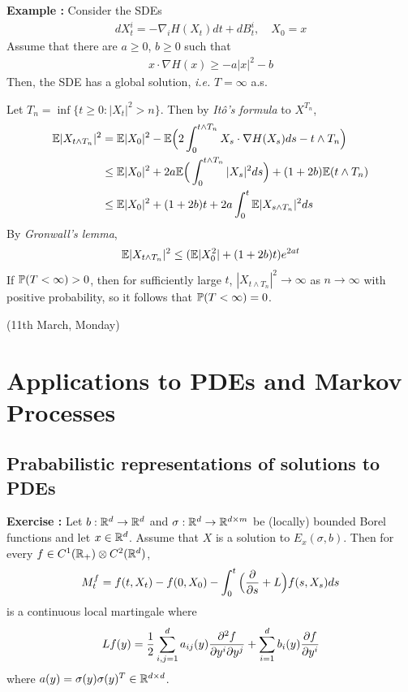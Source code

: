 \documentclass[10pt,a4paper]{article}
\newenvironment{proof}
{\begin{changemargin}{0.5cm}{0.5cm} 
	}%
	{\end{changemargin}
}
\newenvironment{p}
{\begin{proof} 
	}%
	{\end{proof}
}
\begin{document}
\textbf{Example :} Consider the SDEs
\begin{align*}
dX_t^i = -\nabla_i H(X_t) dt + dB_t^i, \quad X_0 =x
\end{align*}
Assume that there are $a\geq 0$, $b\geq 0$ such that
\begin{align*}
x\cdot \nabla H(x) \geq - a|x|^2 -b
\end{align*}
Then, the SDE has a global solution, \textit{i.e.} $T=\infty$ a.s.
\begin{p}
\pf Let $T_n = \inf \{t\geq 0 : |X_t|^2 >n \}$. Then by \emph{It\^o's formula} to $X^{T_n}$,
\begin{align*}
\mathbb{E} |X_{t\wedge T_n}|^2 & = \mathbb{E} |X_0|^2 - \mathbb{E} \Big( 2 \int_0^{t\wedge T_n} X_s \cdot \nabla H(X_s) ds - t\wedge T_n \Big) \\
& \leq \mathbb{E} |X_0|^2 + 2a \mathbb{E} \Big( \int_0^{t\wedge T_n} |X_s|^2 ds \Big) + (1+ 2b) \mathbb{E} (t\wedge T_n) \\
& \leq \mathbb{E} |X_0|^2 + (1+2b)t + 2a\int_0^t \mathbb{E} |X_{s\wedge T_n}|^2 ds  
\end{align*}
By \emph{Gronwall's lemma},
\begin{align*}
\mathbb{E} |X_{t\wedge T_n}|^2 \leq (\mathbb{E} |X_0^2| + (1+2b)t) e^{2at}
\end{align*}
If $\mathbb{P}(T< \infty)>0$, then for sufficiently large $t$, $|X_{t\wedge T_n}|^2 \rightarrow \infty$ as $n\rightarrow \infty$ with positive probability, so it follows that $\mathbb{P}(T< \infty) =0$.

\eop
\end{p}
\s

\newday

(11th March, Monday)

\section{Applications to PDEs and Markov Processes}

\subsection{Prababilistic representations of solutions to PDEs}

\textbf{Exercise :} Let $b: \mathbb{R}^d \rightarrow \mathbb{R}^d$ and $\sigma : \mathbb{R}^d \rightarrow \mathbb{R}^{d\times m}$ be (locally) bounded Borel functions and let $x\in \mathbb{R}^d$. Assume that $X$ is a solution to $E_x(\sigma, b)$. Then for every $f\in C^1(\mathbb{R}_+) \otimes C^2(\mathbb{R}^d)$,
\begin{align*}
M_t^f = f(t, X_t) - f(0, X_0) - \int_0^t \Big( \frac{\partial}{\partial s} + L \Big) f(s, X_s) ds
\end{align*}
is a continuous local martingale where
\begin{align*}
Lf (y) = \frac{1}{2} \sum_{i,j=1}^d a_{ij}(y)\frac{\partial^2 f}{\partial y^i \partial y^j} + \sum_{i=1}^d b_i(y)\frac{\partial f}{\partial y^i}
\end{align*}
where $a(y) = \sigma (y)\sigma(y)^T \in \mathbb{R}^{d\times d}$.
\s
\end{document}
